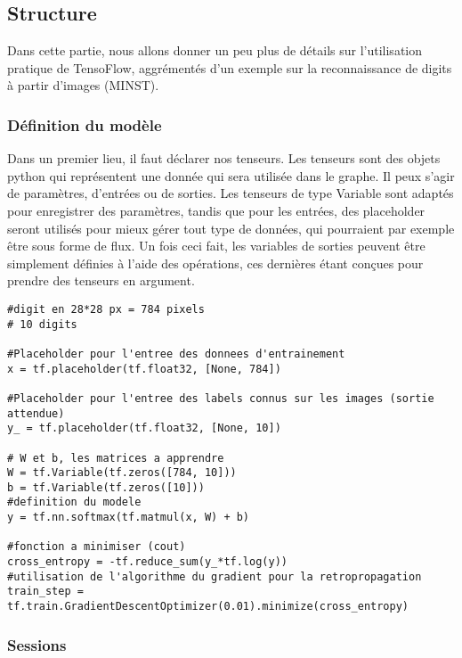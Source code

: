 \subsection{Structure}

Dans cette partie, nous allons donner un peu plus de détails sur l'utilisation pratique de TensoFlow, aggrémentés d'un exemple sur la reconnaissance de digits à partir d'images (MINST).

\subsubsection{Définition du modèle}

Dans un premier lieu, il faut déclarer nos tenseurs. Les tenseurs sont des objets python qui représentent une donnée qui sera utilisée dans le graphe. Il peux s'agir de paramètres, d'entrées ou de sorties. 
Les tenseurs de type Variable sont adaptés pour enregistrer des paramètres, tandis que pour les entrées, des placeholder seront utilisés pour mieux gérer tout type de données, qui pourraient par exemple être sous forme de flux.
Un fois ceci fait, les variables de sorties peuvent être simplement définies à l'aide des opérations, ces dernières étant conçues pour prendre des tenseurs en argument.

        \lstset{style=Python}
        \begin{lstlisting}[caption=Exemple de définition d'un modèle linéaire pour le cas du MINST]
#digit en 28*28 px = 784 pixels
# 10 digits

#Placeholder pour l'entree des donnees d'entrainement
x = tf.placeholder(tf.float32, [None, 784])

#Placeholder pour l'entree des labels connus sur les images (sortie attendue)
y_ = tf.placeholder(tf.float32, [None, 10])

# W et b, les matrices a apprendre
W = tf.Variable(tf.zeros([784, 10]))
b = tf.Variable(tf.zeros([10]))
#definition du modele
y = tf.nn.softmax(tf.matmul(x, W) + b)

#fonction a minimiser (cout)
cross_entropy = -tf.reduce_sum(y_*tf.log(y))
#utilisation de l'algorithme du gradient pour la retropropagation
train_step = tf.train.GradientDescentOptimizer(0.01).minimize(cross_entropy)
        \end{lstlisting}


\subsubsection{Sessions}

